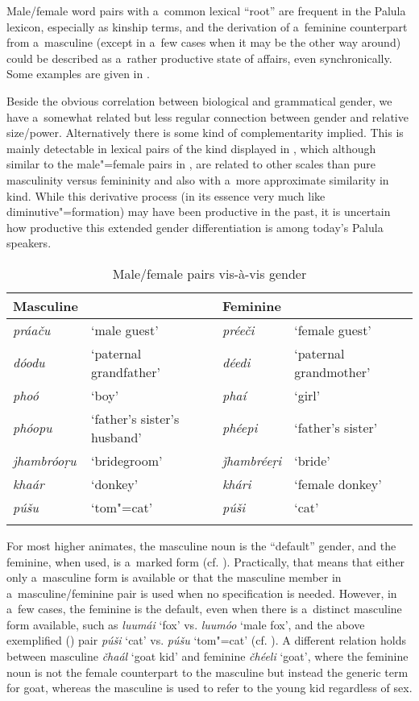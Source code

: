 Male/female word pairs with a~common lexical ``root'' are frequent in the Palula lexicon, especially as kinship terms, and the derivation of a~feminine counterpart from a~masculine (except in a~few cases when it may be the other way around) could be described as a~rather productive state of affairs, even synchronically. Some examples are given in .


Beside the obvious correlation between biological and grammatical gender, we have a~somewhat related but less regular connection between gender and relative size/power. Alternatively there is some kind of complementarity implied. This is mainly detectable in lexical pairs of the kind displayed in , which although similar to the male"=female pairs in , are related to other scales than pure masculinity versus femininity and also with a~more approximate similarity in kind. While this derivative process (in its essence very much like diminutive"=formation) may have been productive in the past, it is uncertain how productive this extended gender differentiation is among today's Palula speakers.



\begin{table}[ht]
\caption{Male/female pairs vis-à-vis gender}
\begin{tabularx}{\textwidth}{ l Q l Q }
\lsptoprule
Masculine &
&
Feminine &
\\\hline
\textit{práaču} &
`male guest' &
\textit{préeči} &
`female guest'\\
\textit{dóodu} &
`paternal grandfather' &
\textit{déedi} &
`paternal grandmother'\\
\textit{phoó} &
`boy' &
\textit{phaí} &
`girl'\\
\textit{phóopu} &
`father's sister's husband' &
\textit{phéepi} &
`father's sister'\\
\textit{jhambróoṛu} &
`bridegroom' &
\textit{ǰhambréeṛi} &
`bride'\\
\textit{khaár} &
`donkey' &
\textit{khári} &
`female donkey'\\
\textit{púšu} &
`tom"=cat' &
\textit{púši} &
`cat'\\\lspbottomrule
\end{tabularx}
\label{tab:4-1}
\end{table}

For most higher animates, the masculine noun is the ``default'' gender, and the feminine, when used, is a~marked form (cf. ). Practically, that means that either only a~masculine form is available or that the masculine member in a~masculine/feminine pair is used when no specification is needed. However, in a~few cases, the feminine is the default, even when there is a~distinct masculine form available, such as \textit{luumái} `fox' vs. \textit{luumóo} `male fox', and the above exemplified () pair \textit{púši} `cat' vs. \textit{púšu} `tom"=cat' (cf. \citealt[103--104]{dahl2000}). A different relation holds between masculine \textit{čhaál} `goat kid' and feminine \textit{čhéeli} `goat', where the feminine noun is not the female counterpart to the masculine but instead the generic term for goat, whereas the masculine is used to refer to the young kid regardless of sex.


